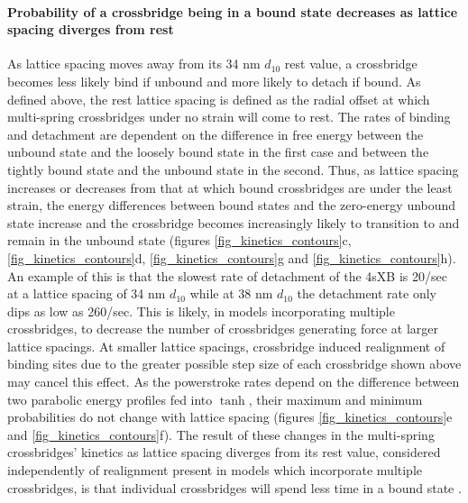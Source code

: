 \documentclass[]{article}
\begin{document}
\paragraph{Probability of a crossbridge being in a bound state decreases as lattice spacing diverges from rest} %
As lattice spacing moves away from its 34 nm $d_{10}$ rest value, a crossbridge becomes less likely bind if unbound and more likely to detach if bound.
As defined above, the rest lattice spacing is defined as the radial offset at which multi-spring crossbridges under no strain will come to rest.
The rates of binding and detachment are dependent on the difference in free energy between the unbound state and the loosely bound state in the first case and between the tightly bound state and the unbound state in the second.
Thus, as lattice spacing increases or decreases from that at which bound crossbridges are under the least strain, the energy differences between bound states and the zero-energy unbound state increase and the crossbridge becomes increasingly likely to transition to and remain in the unbound state (figures \ref{fig_kinetics_contours}c, \ref{fig_kinetics_contours}d, \ref{fig_kinetics_contours}g and \ref{fig_kinetics_contours}h). 
An example of this is that the slowest rate of detachment of the 4sXB is 20/sec at a lattice spacing of 34 nm $d_{10}$ while at 38 nm $d_{10}$ the detachment rate only dips as low as 260/sec.
This is likely, in models incorporating multiple crossbridges, to decrease the number of crossbridges generating force at larger lattice spacings. 
At smaller lattice spacings, crossbridge induced realignment of binding sites due to the greater possible step size of each crossbridge shown above may cancel this effect.
As the powerstroke rates depend on the difference between two parabolic energy profiles fed into $\tanh$, their maximum and minimum probabilities do not change with lattice spacing (figures \ref{fig_kinetics_contours}e and \ref{fig_kinetics_contours}f). 
The result of these changes in the multi-spring crossbridges' kinetics as lattice spacing diverges from its rest value, considered independently of realignment present in models which incorporate multiple crossbridges, is that individual crossbridges will spend less time in a bound state . 
\end{document}
